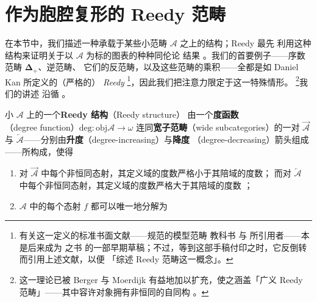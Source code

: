 
\providecommand{\rvAinc}{\vec{\mathcal{A}}}%
\providecommand{\rvAdec}{\overleftarrow{\mathcal{A}}}%
\providecommand{\wlim}{\operatorname{lim}}%
\providecommand{\wcolim}{\operatorname{colim}}%

\section{作为胞腔复形的 Reedy 范畴}\label{sec:reedy-categories-as-cell-complexes}

在本节中，我们描述一种承载于某些小范畴 $\mathcal{A}$ 之上的结构；Reedy 最先
利用这种结构来证明关于以 $\mathcal{A}$ 为标的图表\trCategory{}的种种同伦论
结果 \cite{bib99}。我们的首要例子——序数范畴 $\boldsymbol{\Delta}_+$、逆范畴、
它们的反范畴，以及这些范畴的乘积——全都是如 Daniel Kan 所定义的（严格的）%
\emph{Reedy \trCategory}\footnote{有关这一定义的标准书面文献——规范的模型范畴
教科书 \cite{bib55} 与 \cite{bib57} 所引用者——本是后来成为 \cite{bib39} 之书
的一部早期草稿；不过，等到这部手稿付印之时，它反倒转而引用上述文献，以便
「综述 Reedy 范畴这一概念」。}，因此我们把注意力限定于这一特殊情形。%
\footnote{这一理论已被 Berger 与 Moerdijk 有益地加以扩充，使之涵盖「广义
Reedy 范畴」——其中容许对象拥有非恒同的自同构 \cite{bib12}。}我们的讲述
沿循 \cite{bib107}。

\begin{definition}[Reedy 结构]\label{def:reedy-structure}
小\trCategory{} $\mathcal{A}$ 上的一个\textbf{Reedy 结构}（Reedy structure）
由一个\textbf{度函数}（degree function）$\mathrm{deg}\colon\mathrm{obj}\mathcal{A}\to\omega$ 连同\textbf{宽子范畴}（wide subcategories）的一对
$\rvAinc$ 与 $\rvAdec$——分别由\textbf{升度}（degree-increasing）与\textbf{降度}
（degree-decreasing）箭头组成——所构成，使得
\begin{enumerate}[label=(\roman*)]
\item 对 $\rvAinc$ 中每个非恒同态射，其定义域的度数严格小于其陪域的度数；
  而对 $\rvAdec$ 中每个非恒同态射，其定义域的度数严格大于其陪域的度数%
  ；
\item $\mathcal{A}$ 中的每个态射 $f$ 都可以唯一地分解为
\begin{rveq}\label{eq:reedy-factorization}
\end{rveq}
\end{enumerate}
\end{definition}

